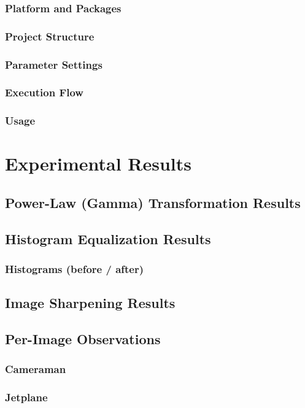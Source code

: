 \documentclass[12pt,a4paper]{article}
\begin{document}
\subsubsection{Platform and Packages} %
\subsubsection{Project Structure} %
\subsubsection{Parameter Settings} %
\subsubsection{Execution Flow} %
\subsubsection{Usage} %

\section{Experimental Results} %
\subsection{Power-Law (Gamma) Transformation Results}
\subsection{Histogram Equalization Results}
\subsubsection{Histograms (before / after)}
\subsection{Image Sharpening Results}
\subsection{Per-Image Observations}
\subsubsection{Cameraman}
\subsubsection{Jetplane}
\end{document}
